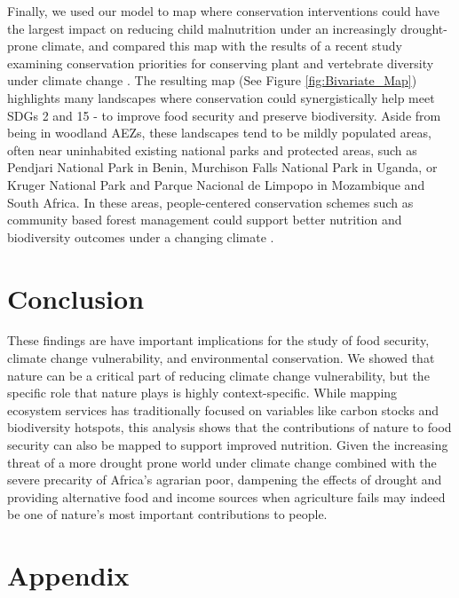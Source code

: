 \documentclass{article}
\begin{document}
Finally, we used our model to map where conservation interventions could have the largest impact on reducing child malnutrition under an increasingly drought-prone climate, and compared this map with the results of a recent study examining conservation priorities for conserving plant and vertebrate diversity under climate change \cite{hannah2020}.  The resulting map (See Figure \ref{fig:Bivariate_Map}) highlights many landscapes where conservation could synergistically help meet SDGs 2 and 15 - to improve food security and preserve biodiversity.  Aside from being in woodland AEZs, these landscapes tend to be mildly populated areas, often near uninhabited existing national parks and protected areas, such as Pendjari National Park in Benin, Murchison Falls National Park in Uganda, or Kruger National Park and Parque Nacional de Limpopo in Mozambique and South Africa.  In these areas, people-centered conservation schemes such as community based forest management could support better nutrition and biodiversity outcomes under a changing climate \cite{bray2003mexico}.

\section{Conclusion}
These findings are have important implications for the study of food security, climate change vulnerability, and environmental conservation.  We showed that nature can be a critical part of reducing climate change vulnerability, but the specific role that nature plays is highly context-specific.  While mapping ecosystem services has traditionally focused on variables like carbon stocks and biodiversity hotspots, this analysis shows that the contributions of nature to food security can also be mapped to support improved nutrition.  Given the increasing threat of a more drought prone world under climate change \cite{Dai2013} combined with the severe precarity of Africa's agrarian poor, dampening the effects of drought and providing alternative food and income sources when agriculture fails may indeed be one of nature's most important contributions to people.




\setcounter{section}{0}
\renewcommand{\thetable}{A\arabic{section}}
\section*{Appendix} \label{AppendixA}
\setcounter{table}{0}
\setcounter{figure}{0}
\renewcommand{\thetable}{A\arabic{table}}
\renewcommand{\thefigure}{A\arabic{figure}}
\end{document}
